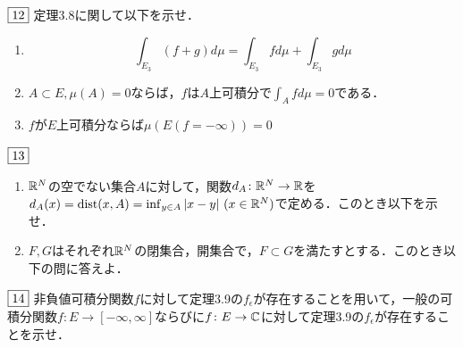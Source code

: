 \documentclass[dvipdfmx, leqno]{jsreport}
\begin{document}
\begin{tcolorbox}$\fbox{12}$
    定理3.8に関して以下を示せ．
\begin{enumerate}
    \item 
\begin{equation}
    \int_{E_3} (f+ g)d\mu= \int_{E_3} fd\mu+ \int_{E_3} gd\mu
\end{equation}
    \item $A\subset E, \mu(A)= 0$ならば，$f$は$A$上可積分で$\int_A fd\mu= 0$である．
    \item $f$が$E$上可積分ならば$\mu(E(f= -\infty))= 0$
\end{enumerate}

\end{tcolorbox}
\begin{tcolorbox}$\fbox{13}$
\begin{enumerate}
    \item $\mathbb{R}^N$の空でない集合$A$に対して，関数$d_A\colon \mathbb{R}^N\to \mathbb{R}$を$d_A(x)= \mathrm{dist}(x, A)= \inf_{y\in A}|x- y|\ (x\in \R^N)$で定める．このとき以下を示せ．
    \item $F, G$はそれぞれ$\mathbb{R}^N$の閉集合，開集合で，$F\subset G$を満たすとする．このとき以下の問に答えよ．
\end{enumerate}
\end{tcolorbox}
\begin{tcolorbox}$\fbox{14}$
    非負値可積分関数$f$に対して定理3.9の$f_\epsilon$が存在することを用いて，一般の可積分関数$f\colon E\to [-\infty, \infty]$ならびに$f\colon E\to \mathbb{C}$に対して定理3.9の$f_\epsilon$が存在することを示せ．
\end{tcolorbox}
\end{document}
